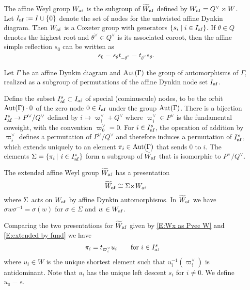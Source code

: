 \documentclass[a4paper]{amsart}
\newcommand{\koushik}[1]{\todo[size=\tiny,color=green!30]{#1}}
\theoremstyle{remark}
\numberwithin{equation}{section}
\begin{document}
The affine Weyl group $W_{\mathrm{af}}$ is the subgroup of $\widetilde{W}_{\mathrm{af}}$ defined by $W_{\mathrm{af}} = Q^\lor \rtimes W$.  Let $I_{\mathrm{af}} := I\cup\{0\}$ denote the set of nodes for the untwisted affine Dynkin diagram.
Then $W_{\mathrm{af}}$ is a Coxeter group with generators $\{s_i\mid i\in I_{\mathrm{af}}\}$. 
If \(\theta\in Q\) denotes the highest root and $\theta^\vee\in Q^\vee$ is its associated coroot, then the affine simple reflection \(s_0\) can be written as
\begin{align}
s_0 = s_\theta t_{-\theta^\lor} = t_{\theta^\lor} s_\theta.
\end{align}
{
Let $\Gamma$ be an affine Dynkin diagram and $\mathrm{Aut}(\Gamma)$ the group of automorphisms of $\Gamma$, realized as a subgroup of permutations of the affine Dynkin node set $I_{\mathrm{af}}$. 

Define the subset $I_{\mathrm{af}}^s\subset I_{\mathrm{af}}$ of special (cominuscule) nodes, to be the orbit $\mathrm{Aut}(\Gamma)\cdot 0$ of the zero node $0\in I_{\mathrm{af}}$ under the group $\mathrm{Aut}(\Gamma)$.
There is a bijection $I_{\mathrm{af}}^s\to P^\lor/Q^\lor$ defined by
$i\mapsto \varpi_i^\lor+Q^\lor$ where $\varpi_i^\vee\in P^\vee$ is the fundamental coweight, with the convention $\varpi_0^\lor=0$. For $i\in I_{\mathrm{af}}^s$, the operation of addition by $\varpi_i^\lor$ defines a permutation of $P^\lor/Q^\lor$ and therefore induces a permutation of $I_{\mathrm{af}}^s$, which extends uniquely to an element $\pi_i\in \mathrm{Aut}(\Gamma)$ that sends $0$ to $i$. The elements $\Sigma = \{\pi_i\mid i\in I_{\mathrm{af}}^s\}$ form a subgroup of $\widetilde{W}_{\mathrm{af}}$ that is isomorphic to $P^\lor/Q^\lor$. 
}
The extended affine Weyl group $\widetilde{W}_{\mathrm{af}}$ has a presentation 
\begin{align}\label{E:extended by fund}
\widetilde{W}_{\mathrm{af}}\cong \Sigma {\ltimes} W_{\mathrm{af}}
\end{align}
where $\Sigma$ acts on $W_{\mathrm{af}}$ by affine Dynkin automorphisms. In $\widetilde{W}_{\mathrm{af}}$ we have
$\sigma w \sigma^{-1} = \sigma(w)$ for $\sigma\in\Sigma$ and $w\in W_{\mathrm{af}}$.

Comparing the two presentations for $\widetilde{W}_{\mathrm{af}}$ given by \eqref{E:Wx as Pvee W} and
\eqref{E:extended by fund} we have
\begin{align}\label{eq_act_pi}
   \pi_i &= t_{\varpi_i^\lor} u_i\qquad\text{for $i\in I_{\mathrm{af}}^s$}
\end{align}
where $u_i\in W$ is the unique shortest element such that $u_i^{-1}(\varpi_i^\lor)$ is antidominant. Note that
$u_i$ has the unique left descent $s_i$ for $i\neq 0$. We define $u_0=e$.
\end{document}
